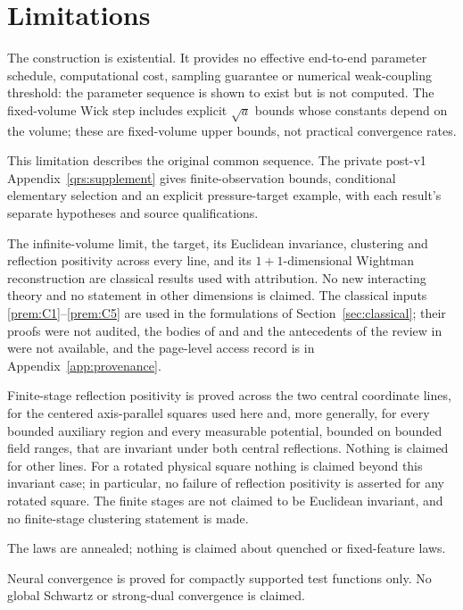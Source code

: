 \documentclass[11pt]{article}
\theoremstyle{plain}
\theoremstyle{definition}
\theoremstyle{remark}
\begin{document}
\section{Limitations}\label{sec:limits}

The construction is existential. It provides no effective end-to-end parameter
schedule, computational cost, sampling guarantee or numerical weak-coupling
threshold: the parameter sequence is shown to exist but is not computed. The
fixed-volume Wick step includes explicit $\sqrt a$ bounds whose constants depend
on the volume; these are fixed-volume upper bounds, not practical convergence
rates.

This limitation describes the original common sequence. The private
post-v1 Appendix~\ref{qrs:supplement} gives finite-observation bounds,
conditional elementary selection and an explicit pressure-target example,
with each result's separate hypotheses and source qualifications.

The infinite-volume limit, the target, its Euclidean invariance, clustering and
reflection positivity across every line, and its $1+1$-dimensional Wightman
reconstruction are classical results used with attribution. No new interacting
theory and no statement in other dimensions is claimed. The classical inputs
\ref{prem:C1}--\ref{prem:C5} are used in the formulations of
Section~\ref{sec:classical}; their proofs were not audited, the bodies of
\cite{OS1973,OS1975} and \cite{StreaterWightman1964} and the antecedents of the
review in \cite[pp.~316--319]{GRS1976} were not available, and the page-level
access record is in Appendix~\ref{app:provenance}.

Finite-stage reflection positivity is proved across the two central coordinate
lines, for the centered axis-parallel squares used here and, more generally, for
every bounded auxiliary region and every measurable potential, bounded on
bounded field ranges, that are invariant under both central reflections. Nothing
is claimed for other lines. For a rotated physical square nothing is claimed
beyond this invariant case; in particular, no failure of reflection positivity
is asserted for any rotated square. The finite stages are not claimed to be
Euclidean invariant, and no finite-stage clustering statement is made.

The laws are annealed; nothing is claimed about quenched or fixed-feature laws.

Neural convergence is proved for compactly supported test functions only. No
global Schwartz or strong-dual convergence is claimed.
\end{document}
